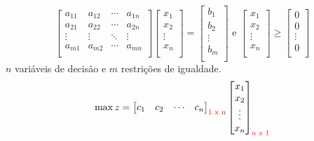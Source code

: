 \begin{frame}
\begin{mdframed}[backgroundcolor=blue!20]
{\begin{equation*}
				\begin{bmatrix}
						a_{11} & a_{12} & \cdots & a_{1n} \\
						a_{21} & a_{22} & \cdots & a_{2n} \\
						\vdots & \vdots & \ddots & \vdots \\
						a_{m1} & a_{m2} & \cdots & a_{mn} \\
				\end{bmatrix}
				\begin{bmatrix}
						x_1 \\
						x_2 \\
						\vdots \\
						x_n \\
				\end{bmatrix} = 
				\begin{bmatrix}
						b_1 \\
						b_2 \\
						\vdots \\
						b_m \\
				\end{bmatrix} \text{ e }
				\begin{bmatrix}
						x_1 \\
						x_2 \\
						\vdots \\
						x_n \\
				\end{bmatrix} \ge
				\begin{bmatrix}
						0 \\
						0 \\
						\vdots \\
						0 \\
				\end{bmatrix} 				
			\end{equation*}			
			$n$ variáveis de decisão e $m$ restrições de igualdade.
		}
		\only<4>
		{
			\begin{equation*} 
				\max z = \begin{bmatrix}
							c_1 & c_2 & \cdots & c_n \\
						 \end{bmatrix}_{\text{\color{red}1 x n}}
						 \begin{bmatrix}
							 x_1 \\
							 x_2 \\
							 \vdots \\
							 x_n \\
						 \end{bmatrix}_{\text{\color{red}n x 1}} 

\end{equation*}}
\end{mdframed}
\end{frame}
